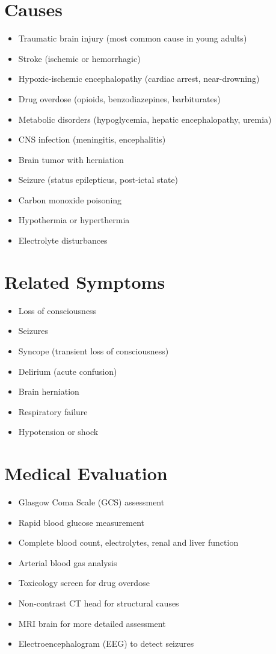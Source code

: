 \section*{Causes}
\begin{itemize}
\item Traumatic brain injury (most common cause in young adults)
\item Stroke (ischemic or hemorrhagic)
\item Hypoxic-ischemic encephalopathy (cardiac arrest, near-drowning)
\item Drug overdose (opioids, benzodiazepines, barbiturates)
\item Metabolic disorders (hypoglycemia, hepatic encephalopathy, uremia)
\item CNS infection (meningitis, encephalitis)
\item Brain tumor with herniation
\item Seizure (status epilepticus, post-ictal state)
\item Carbon monoxide poisoning
\item Hypothermia or hyperthermia
\item Electrolyte disturbances
\end{itemize}

\section*{Related Symptoms}
\begin{itemize}
\item Loss of consciousness
\item Seizures
\item Syncope (transient loss of consciousness)
\item Delirium (acute confusion)
\item Brain herniation
\item Respiratory failure
\item Hypotension or shock
\end{itemize}

\section*{Medical Evaluation}
\begin{itemize}
\item Glasgow Coma Scale (GCS) assessment
\item Rapid blood glucose measurement
\item Complete blood count, electrolytes, renal and liver function
\item Arterial blood gas analysis
\item Toxicology screen for drug overdose
\item Non-contrast CT head for structural causes
\item MRI brain for more detailed assessment
\item Electroencephalogram (EEG) to detect seizures
\end{itemize}

